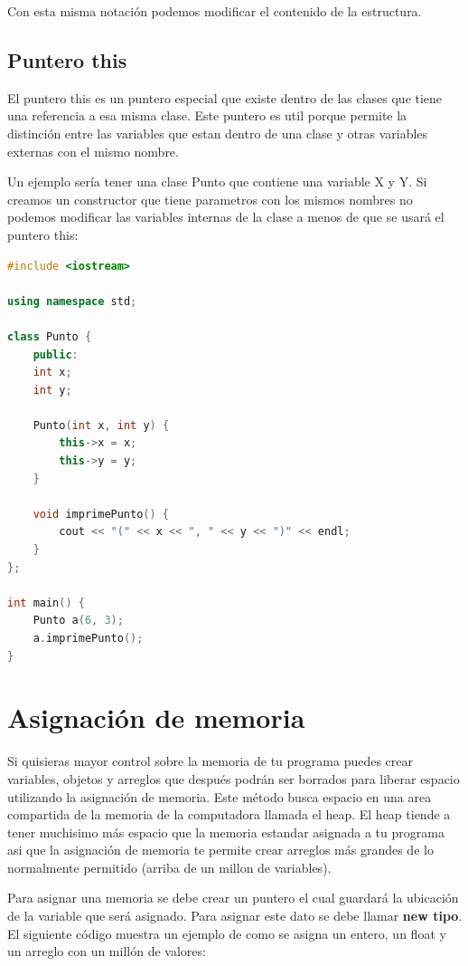 \documentclass{article}
\begin{document}
Con esta misma notación podemos modificar el contenido de la estructura.

\subsection{Puntero this}

El puntero this es un puntero especial que existe dentro de las clases que tiene una referencia a esa misma clase. Este puntero es util porque permite la distinción entre las variables que estan dentro de una clase y otras variables externas con el mismo nombre.

Un ejemplo sería tener una clase Punto que contiene una variable X y Y. Si creamos un constructor que tiene parametros con los mismos nombres no podemos modificar las variables internas de la clase a menos de que se usará el puntero this:

\begin{lstlisting}[language=C++, caption=Puntero this]
#include <iostream>

using namespace std;

class Punto {
    public:
    int x;
    int y;

    Punto(int x, int y) {	
        this->x = x;
        this->y = y;
    }

    void imprimePunto() {
        cout << "(" << x << ", " << y << ")" << endl;
    }
};

int main() {
    Punto a(6, 3);
    a.imprimePunto();
}    
\end{lstlisting}

\section{Asignación de memoria}

Si quisieras mayor control sobre la memoria de tu programa puedes crear variables, objetos y arreglos que después podrán ser borrados para liberar espacio utilizando la asignación de memoria. Este método busca espacio en una area compartida de la memoria de la computadora llamada el heap. El heap tiende a tener muchisimo más espacio que la memoria estandar asignada a tu programa asi que la asignación de memoria te permite crear arreglos más grandes de lo normalmente permitido (arriba de un millon de variables).

Para asignar una memoria se debe crear un puntero el cual guardará la ubicación de la variable que será asignado. Para asignar este dato se debe llamar \textbf{new tipo}. El siguiente código muestra un ejemplo de como se asigna un entero, un float y un arreglo con un millón de valores:
\end{document}
